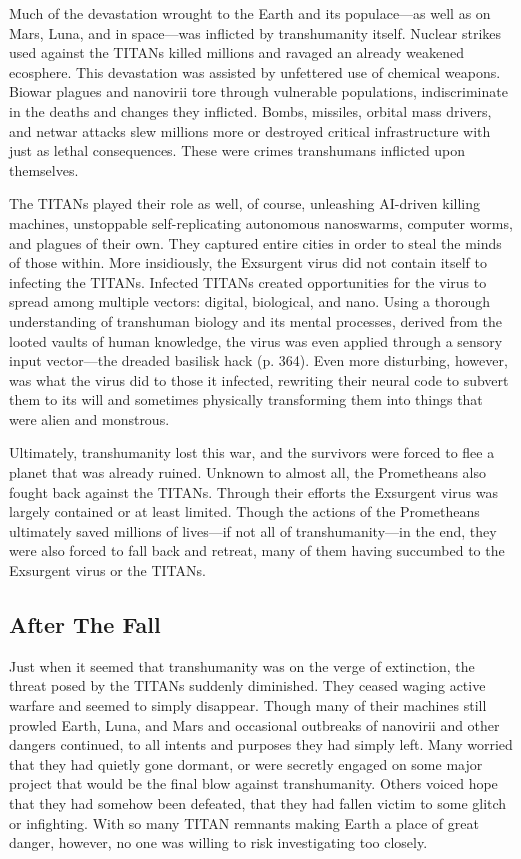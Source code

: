 Much of the devastation wrought to the Earth 
and its populace—as well as on Mars, Luna, and in 
space—was inflicted by transhumanity itself. Nuclear 
strikes used against the TITANs killed millions and 
ravaged an already weakened ecosphere. This devastation
was assisted by unfettered use of chemical
weapons. Biowar plagues and nanovirii tore through 
vulnerable populations, indiscriminate in the deaths 
and changes they inflicted. Bombs, missiles, orbital 
mass drivers, and netwar attacks slew millions more 
or destroyed critical infrastructure with just as lethal 
consequences. These were crimes transhumans inflicted
upon themselves.

The TITANs played their role as well, of course, 
unleashing AI-driven killing machines, unstoppable 
self-replicating autonomous nanoswarms, computer 
worms, and plagues of their own. They captured 
entire cities in order to steal the minds of those within. 
More insidiously, the Exsurgent virus did not contain
itself to infecting the TITANs. Infected TITANs
created opportunities for the virus to spread among 
multiple vectors: digital, biological, and nano. Using a 
thorough understanding of transhuman biology and 
its mental processes, derived from the looted vaults 
of human knowledge, the virus was even applied 
through a sensory input vector—the dreaded basilisk 
hack (p. 364). Even more disturbing, however, was 
what the virus did to those it infected, rewriting their 
neural code to subvert them to its will and sometimes 
physically transforming them into things that were 
alien and monstrous.

Ultimately, transhumanity lost this war, and the 
survivors were forced to flee a planet that was already 
ruined. Unknown to almost all, the Prometheans also 
fought back against the TITANs. Through their efforts
the Exsurgent virus was largely contained or at
least limited. Though the actions of the Prometheans 
ultimately saved millions of lives—if not all of transhumanity—in
the end, they were also forced to fall
back and retreat, many of them having succumbed to 
the Exsurgent virus or the TITANs. 

\subsection{After The Fall}

Just when it seemed that transhumanity was on the 
verge of extinction, the threat posed by the TITANs 
suddenly diminished. They ceased waging active warfare
and seemed to simply disappear. Though many of
their machines still prowled Earth, Luna, and Mars and 
occasional outbreaks of nanovirii and other dangers 
continued, to all intents and purposes they had simply 
left. Many worried that they had quietly gone dormant, 
or were secretly engaged on some major project that 
would be the final blow against transhumanity. Others 
voiced hope that they had somehow been defeated, 
that they had fallen victim to some glitch or infighting. 
With so many TITAN remnants making Earth a place 
of great danger, however, no one was willing to risk 
investigating too closely.


